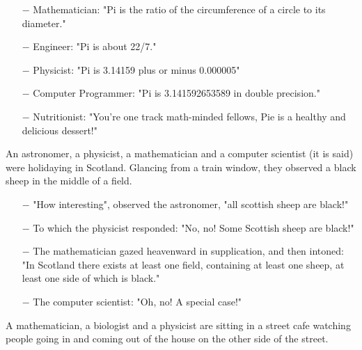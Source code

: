 \begin{itemize}	 
	\item[$-$] Mathematician: "Pi is the ratio of the circumference of a circle to its diameter."

	\item[$-$] Engineer: "Pi is about 22/7."

	\item[$-$] Physicist: "Pi is 3.14159 plus or minus 0.000005"

	\item[$-$] Computer Programmer: "Pi is 3.141592653589 in double precision."

	\item[$-$] Nutritionist: "You're one track math-minded fellows, Pie is a healthy and delicious dessert!"
\end{itemize}
	\begin{center}\underline{\hspace{5 cm}}\end{center}
	
An astronomer, a physicist, a mathematician and a computer scientist (it is said) were holidaying in Scotland. Glancing from a train window, they observed a black sheep in the middle of a field. 

\begin{itemize}	 
	\item[$-$] "How interesting", observed the astronomer, "all scottish sheep are black!" 

	\item[$-$] To which the physicist responded: "No, no! Some Scottish sheep are black!" 

	\item[$-$] The mathematician gazed heavenward in supplication, and then intoned: "In Scotland there exists at least one field, containing at least one sheep, at least one side of which is black."

	\item[$-$] The computer scientist: "Oh, no! A special case!"	
	
\end{itemize}
	\begin{center}\underline{\hspace{5 cm}}\end{center}	
	
A mathematician, a biologist and a physicist are sitting in a street cafe watching people going in and coming out of the house on the other side of the street. 

